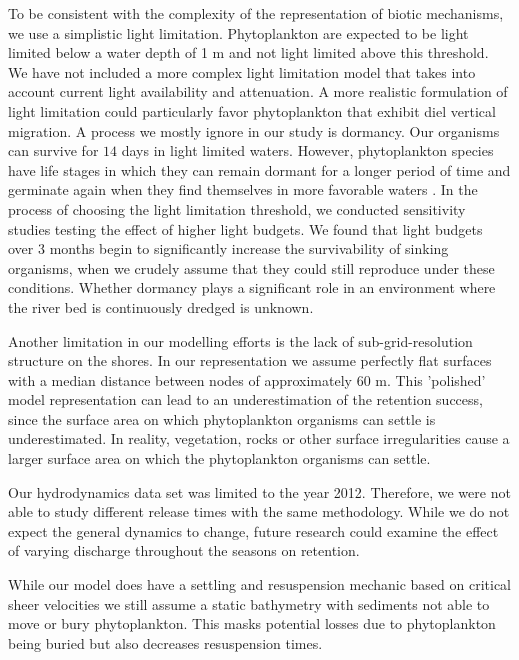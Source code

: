 \documentclass[npg, manuscript]{copernicus}
\begin{document}
To be consistent with the complexity of the representation of biotic mechanisms, we use a simplistic light limitation.
Phytoplankton are expected to be light limited below a water depth of 1 \unit{m} and not light limited above this threshold. 
We have not included a more complex light limitation model that takes into account current light availability and attenuation.
A more realistic formulation of light limitation could particularly favor phytoplankton that exhibit diel vertical migration.
A process we mostly ignore in our study is dormancy.
Our organisms can survive for $14$ days in light limited waters.
However, phytoplankton species have life stages in which they can remain dormant for a longer period of time and germinate again when they find themselves in more favorable waters \citep{ThomasAnderson1998}.
In the process of choosing the light limitation threshold, we conducted sensitivity studies testing the effect of higher light budgets.
We found that light budgets over 3 months begin to significantly increase the survivability of sinking organisms, when we crudely assume that they could still reproduce under these conditions.
Whether dormancy plays a significant role in an environment where the river bed is continuously dredged is unknown.

Another limitation in our modelling efforts is the lack of sub-grid-resolution structure on the shores.
In our representation we assume perfectly flat surfaces with a median distance between nodes of approximately 60 \unit{m}. 
This 'polished' model representation can lead to an underestimation of the retention success, since the surface area on which phytoplankton organisms can settle is underestimated.
In reality, vegetation, rocks or other surface irregularities cause a larger surface area on which the phytoplankton organisms can settle.

Our hydrodynamics data set was limited to the year 2012.
Therefore, we were not able to study different release times with the same methodology.
While we do not expect the general dynamics to change, future research could examine the effect of varying discharge throughout the seasons on retention.

While our model does have a settling and resuspension mechanic based on critical sheer velocities we still assume a static bathymetry with sediments not able to move or bury phytoplankton. 
This masks potential losses due to phytoplankton being buried but also decreases resuspension times.

\medskip
\end{document}
